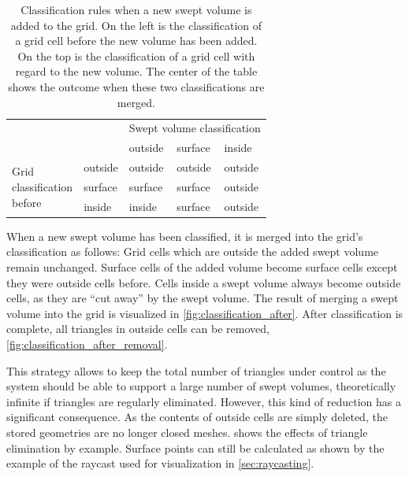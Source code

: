 \begin{table}[h]
	\centering
	\begin{tabular}{p{2cm}p{2cm}|p{2cm}p{2cm}p{2cm}}
		                                                                &         & \multicolumn{3}{l}{Swept volume classification} \\
		                                                                &         & outside & surface & inside                      \\
		\midrule                                                                                                                    
		\multirow{3}{*}{\parbox{2cm}{Grid \\ classification \\ before}} & outside & outside & outside & outside                     \\
		                                                                & surface & surface & surface & outside                     \\
		                                                                & inside  & inside  & surface & outside                     
	\end{tabular}
	\caption{
		Classification rules when a new swept volume is added to the grid.
		On the left is the classification of a grid cell before the new volume has been added.
		On the top is the classification of a grid cell with regard to the new volume.
		The center of the table shows the outcome when these two classifications are merged.
	}
	\label{tbl:classification_rules}
\end{table}

When a new swept volume has been classified, it is merged into the grid's classification as follows:
Grid cells which are outside the added swept volume remain unchanged.
Surface cells of the added volume become surface cells except they were outside cells before.
Cells inside a swept volume always become outside cells, as they are \enquote{cut away} by the swept volume.
The result of merging a swept volume into the grid is visualized in \cref{fig:classification_after}.
After classification is complete, all triangles in outside cells can be removed, \cf \cref{fig:classification_after_removal}.

This strategy allows to keep the total number of triangles under control as the system should be able to support a large number of swept volumes, theoretically infinite if triangles are regularly eliminated.
%
However, this kind of reduction has a significant consequence.
As the contents of outside cells are simply deleted, the stored geometries are no longer closed meshes.
 shows the effects of triangle elimination by example.
Surface points can still be calculated as shown by the example of the raycast used for visualization in \cref{sec:raycasting}.

